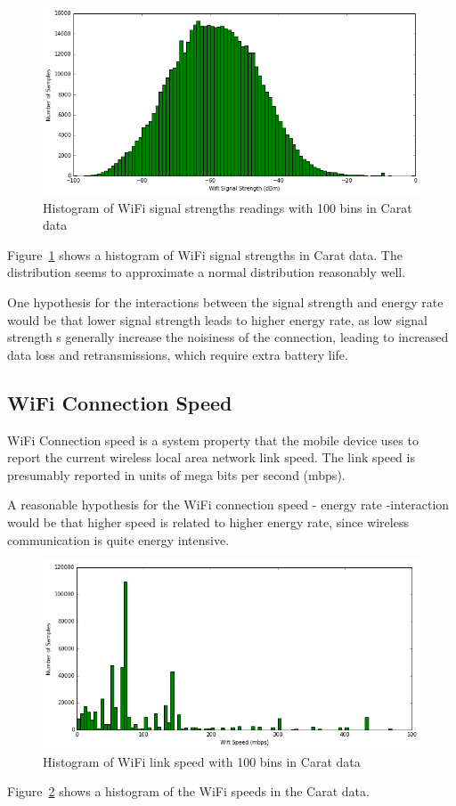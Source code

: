  \begin{figure} %
	\centering
	\includegraphics[width=\textwidth]{images/carat-data/wifi_signal_strength.png}
	\caption{Histogram of WiFi signal strengths readings with 100 bins in Carat data}
	\label{figure:carat-data-wifi-signal-strength}
\end{figure} 

Figure~\ref{figure:carat-data-wifi-signal-strength} shows a histogram of WiFi signal strengths in Carat data. The distribution seems to approximate a normal distribution reasonably well. 

One hypothesis for the interactions between the signal strength and energy rate would be that lower signal strength leads to higher energy rate, as low signal strength s generally increase the noisiness of the connection, leading to increased data loss and retransmissions, which require extra battery life.

\subsection{WiFi Connection Speed}

WiFi Connection speed is a system property that the mobile device uses to report the current wireless local area network link speed. The link speed is presumably reported in units of mega bits per second (mbps). 

A reasonable hypothesis for the WiFi connection speed - energy rate -interaction would be that higher speed is related to higher energy rate, since wireless communication is quite energy intensive. 

 \begin{figure} %
	\centering
	\includegraphics[width=\textwidth]{images/carat-data/wifi_speed.png}
	\caption{Histogram of WiFi link speed with 100 bins in Carat data}
	\label{figure:carat-data-wifi-speed}
\end{figure}

Figure~\ref{figure:carat-data-wifi-speed} shows a histogram of the WiFi speeds in the Carat data. 